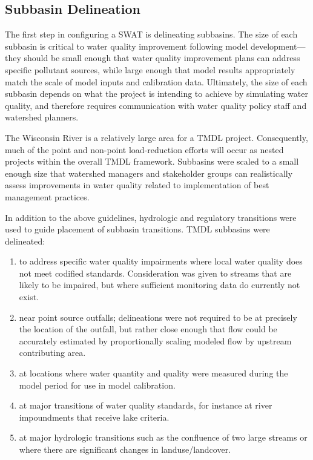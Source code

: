\subsection{Subbasin Delineation}\label{sec:sub_delineation}
The first step in configuring a SWAT is delineating subbasins. The size of each subbasin is critical to water quality improvement following model development---they should be small enough that water quality improvement plans can address specific pollutant sources, while large enough that model results appropriately match the scale of model inputs and calibration data. Ultimately, the size of each subbasin depends on what the project is intending to achieve by simulating water quality, and therefore requires communication with water quality policy staff and watershed planners.


The Wisconsin River is a relatively large area for a TMDL project. Consequently, much of the point and non-point load-reduction efforts will occur as nested projects within the overall TMDL framework. Subbasins were scaled to a small enough size that watershed managers and stakeholder groups can realistically assess improvements in water quality related to implementation of best management practices.

In addition to the above guidelines, hydrologic and regulatory transitions were used to guide placement of subbasin transitions. TMDL subbasins were delineated: 
\begin{enumerate}
	\item to address specific water quality impairments where local water quality does not meet codified standards. Consideration was given to streams that are likely to be impaired, but where sufficient monitoring data do currently not exist.
	\item near point source outfalls; delineations were not required to be at precisely the location of the outfall, but rather close enough that flow could be accurately estimated by proportionally scaling modeled flow by upstream contributing area.
	\item at locations where water quantity and quality were measured during the model period for use in model calibration.
	\item at major transitions of water quality standards, for instance at river impoundments that receive lake criteria.
	\item at major hydrologic transitions such as the confluence of two large streams or where there are significant changes in landuse/landcover.
\end{enumerate}

